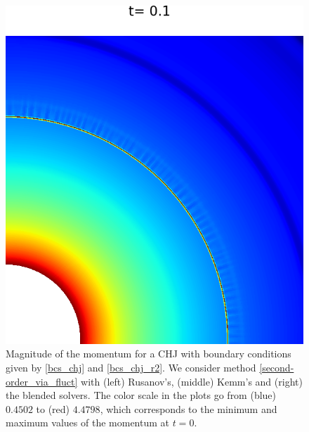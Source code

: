 \documentclass[preprint, 11pt]{article}
\begin{document}
\begin{figure}[!h]
  \includegraphics[scale=0.28]{figures/chj_r2_blended_t0p1.png} 
  \caption{Magnitude of the momentum for a CHJ with boundary conditions given by
    \eqref{bcs_chj} and \eqref{bcs_chj_r2}. 
    We consider method \eqref{second-order_via_fluct} with (left) Rusanov's,
    (middle) Kemm's and (right) the blended solvers. 
    The color scale in the plots go from (blue) $0.4502$ to (red) $4.4798$,
    which corresponds to the minimum and maximum values of the momentum at $t=0$.
    \label{fig:chj_r2}}
\end{figure}
\end{document}
